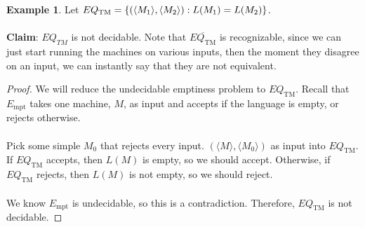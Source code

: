 \documentclass[]{article}
\DeclarePairedDelimiter{\set}{\lbrace}{\rbrace}
\theoremstyle{definition}
\newtheorem{ex}{Example}[section]
\begin{document}
      \begin{ex}
        Let $EQ_\text{TM} = \set{(\langle M_1 \rangle, \langle M_2 \rangle) : L(M_1) = L(M_2)}$.
        \\ \\
        \textbf{Claim}: $EQ_{TM}$ is not decidable. Note that $\overline{EQ_\text{TM}}$ is recognizable, since we can just start running the machines on various inputs, then the moment they disagree on an input, we can instantly say that they are not equivalent.

        \begin{proof}
          We will reduce the undecidable emptiness problem to $EQ_\text{TM}$. Recall that $E_\text{mpt}$ takes one machine, $M$, as input and accepts if the language is empty, or rejects otherwise.
          \\ \\
          Pick some simple $M_0$ that rejects every input. $(\langle M \rangle, \langle M_0 \rangle)$ as input into $EQ_\text{TM}$. If $EQ_\text{TM}$ accepts, then $L(M)$ is empty, so we should accept. Otherwise, if $EQ_\text{TM}$ rejects, then $L(M)$ is not empty, so we should reject.
          \\ \\
          We know $E_\text{mpt}$ is undecidable, so this is a contradiction. Therefore, $EQ_\text{TM}$ is not decidable.
        \end{proof}
      \end{ex}
\end{document}
